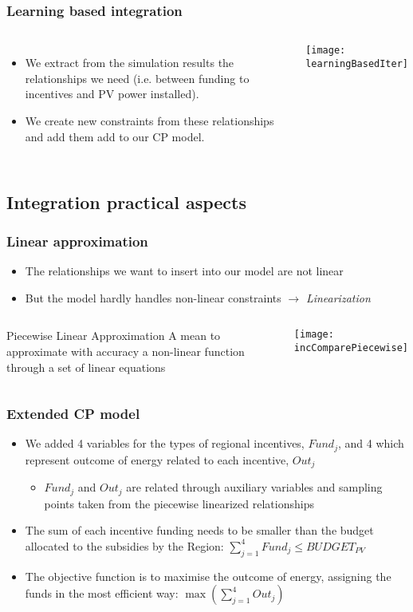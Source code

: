 \documentclass{beamer}
\begin{document}
	\begin{frame}
	\frametitle{Learning based integration}
		\begin{columns}
			\begin{itemize}
				\item We extract from the simulation results the relationships we need (i.e. between funding to incentives and PV power installed).
				\item We create new constraints from these relationships and add them add to our CP model.
			\end{itemize}
			\centering
			\texttt{[image: learningBasedIter]}
		\end{columns}
	\end{frame}
	
\subsection{Integration practical aspects}

	\begin{frame}
	\frametitle{Linear approximation}
		\begin{itemize}
			\item The relationships we want to insert into our model are not linear
			\item But the model hardly handles non-linear constraints $ \rightarrow $ \emph{Linearization}
		\end{itemize}
		\begin{columns}
		\column{.4\textwidth}
			\begin{block}{Piecewise Linear Approximation}
				 A mean to approximate with accuracy a non-linear function through a set of linear equations
			\end{block}
		\column{.6\textwidth}
		\centering
		\texttt{[image: incComparePiecewise]}
		\end{columns}
	\end{frame}

	\begin{frame}
	\frametitle{Extended CP model}
		\begin{itemize}
			\item We added 4 variables for the types of regional incentives, $Fund_j$, and 4 which represent outcome of energy related to each incentive, $Out_j$ 
			\begin{itemize}
				\item $ Fund_j $ and $ Out_j $ are related through auxiliary variables and sampling points taken from the piecewise linearized relationships
			\end{itemize}
			\item The sum of each incentive funding needs to be smaller than the budget allocated to the subsidies by the Region: $ \sum_{j=1}^4 Fund_j \leq BUDGET_{PV} $
			\item The objective function is to maximise the outcome of energy, assigning the funds in the most efficient way: $ \max ( \sum_{j=1}^4 Out_j ) $
		\end{itemize}	
	\end{frame}
\end{document}

